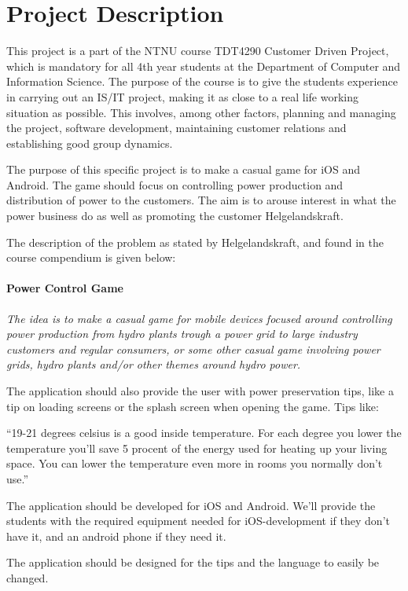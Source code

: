 \section{Project Description}

This project is a part of the NTNU course TDT4290 Customer Driven Project, which is mandatory for all 4th year students at the Department of Computer and Information Science. The purpose of the course is to give the students experience in carrying out an IS/IT project, making it as close to a real life working situation as possible. This involves, among other factors, planning and managing the project, software development, maintaining customer relations and establishing good group dynamics.

The purpose of this specific project is to make a casual game for iOS and Android. The game should focus on controlling power production and distribution of power to the customers. The aim is to arouse interest in what the power business do as well as promoting the customer Helgelandskraft.

The description of the problem as stated by Helgelandskraft, and found in the course compendium is given below: 
		\paragraph{Power Control Game}
		{\it The idea is to make a casual game for mobile devices focused around controlling 
		power production from hydro plants trough a power grid to large industry customers and 
		regular consumers, or some other casual game involving power grids, hydro plants 
		and/or other themes around hydro power. 
		 
		The application should also provide the user with power preservation tips, like a 
		tip on loading screens or the splash screen when opening the game. Tips like: 
		 
		“19-21 degrees celsius is a good inside temperature. For each degree you lower the temperature 
		you’ll save 5 procent of the energy used for heating up your living space. 
		You can lower the temperature even more in rooms you normally don’t use.” 
		 
		The application should be developed for iOS and Android. We’ll provide the 
		students with the required equipment needed for iOS-development if they don’t 
		have it, and an android phone if they need it. 
		 
		The application should be designed for the tips and the language to easily be changed.}

\clearpage
